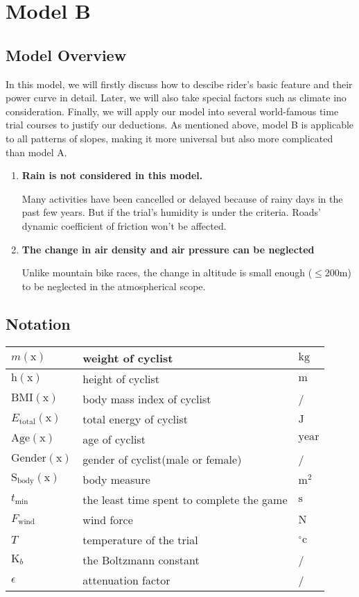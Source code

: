 \documentclass[14pt]{article}
\theoremstyle{definition}
\theoremstyle{remark}
\numberwithin{equation}{section}
\begin{document}
	
	\section{Model B}
	\subsection{Model Overview}
	In this model, we will firstly discuss how to descibe rider's basic feature and their power curve in detail. Later, we will also take special factors such as climate ino consideration. Finally, we will apply our model into several world-famous time trial courses to justify our deductions. As mentioned above, model B is applicable to all patterns of slopes, making it more universal but also more complicated than model A.
	\begin{enumerate}
		\item	\textbf{Rain is not considered in this model.}

				Many activities have been cancelled or delayed because of rainy days in the past few years. But if the trial's humidity is under the criteria. Roads' dynamic coefficient of friction won't be affected.
		\item \textbf{The change in air density and air pressure can be neglected}

				Unlike mountain bike races, the change in altitude is small enough (\(\leq 200\mathrm{m}\)) to be neglected in the atmospherical scope.
	\end{enumerate}
	\subsection{Notation}
	\begin{tabular}{|l|l|l|}
		\hline
		$m(\mathrm{x})$&weight of cyclist&$\mathrm{kg}$\\
		\hline
		$\mathrm{h}(\mathrm{x})$&height of cyclist&$\mathrm{m}$\\
		\hline
		$\mathrm{BMI}(\mathrm{x})$&body mass index of cyclist&/\\
		\hline
		$E_\mathrm{total} (\mathrm{x})$&total energy of cyclist&$\mathrm{J}$\\
		\hline
		$\mathrm{Age}(\mathrm{x})$&age of cyclist&$\mathrm{year}$\\
		\hline
		$\mathrm{Gender}(\mathrm{x})$&gender of cyclist(male or female)&/\\
		\hline
		$\mathrm{S}_\mathrm{body}(\mathrm{x})$&body measure&$\mathrm{m}^2$\\
		\hline
		$t_\mathrm{min}$&the least time spent to complete the game&$\mathrm{s}$\\
		\hline
		$F_\mathrm{wind}$&wind force&$\mathrm{N}$\\
		\hline
		$T$&temperature of the trial&$^{\circ}\mathrm{c}$\\
		\hline
		$\mathrm{K}_b$&the Boltzmann constant&/\\
		\hline
		$\epsilon$&attenuation factor&/\\
		\hline
	\end{tabular}
\end{document}
